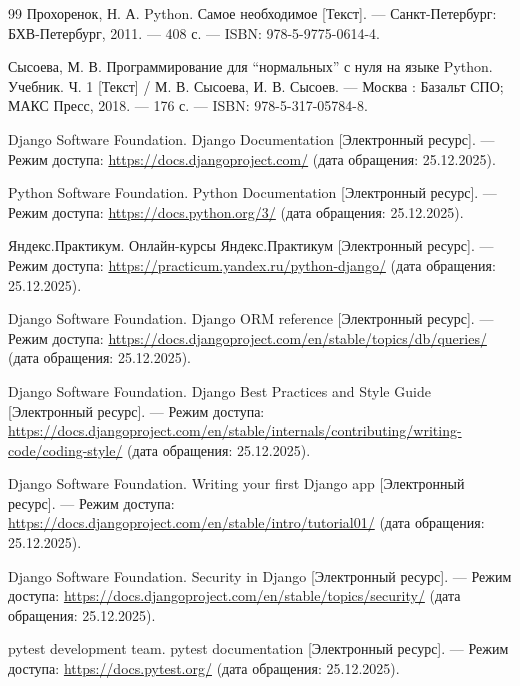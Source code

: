 \documentclass[pract,och,bachelor]{SCWorks}
\begin{document}
\begin{thebibliography}{99}
     Прохоренок, Н. А. Python. Самое необходимое [Текст]. — Санкт-Петербург: БХВ-Петербург, 2011. — 408 с. — ISBN: 978-5-9775-0614-4.
    
     Сысоева, М. В. Программирование для ``нормальных'' с нуля на языке Python. Учебник. Ч. 1 [Текст] / М. В. Сысоева, И. В. Сысоев. — Москва : Базальт СПО; МАКС Пресс, 2018. — 176 с. — ISBN: 978-5-317-05784-8.
    
     Django Software Foundation. Django Documentation [Электронный ресурс]. — Режим доступа: \url{https://docs.djangoproject.com/} (дата обращения: 25.12.2025).
    
     Python Software Foundation. Python Documentation [Электронный ресурс]. — Режим доступа: \url{https://docs.python.org/3/} (дата обращения: 25.12.2025).
    
     Яндекс.Практикум. Онлайн-курсы Яндекс.Практикум [Электронный ресурс]. — Режим доступа: \url{https://practicum.yandex.ru/python-django/} (дата обращения: 25.12.2025).
    
     Django Software Foundation. Django ORM reference [Электронный ресурс]. — Режим доступа: \url{https://docs.djangoproject.com/en/stable/topics/db/queries/} (дата обращения: 25.12.2025).
    
     Django Software Foundation. Django Best Practices and Style Guide [Электронный ресурс]. — Режим доступа: \url{https://docs.djangoproject.com/en/stable/internals/contributing/writing-code/coding-style/} (дата обращения: 25.12.2025).
    
     Django Software Foundation. Writing your first Django app [Электронный ресурс]. — Режим доступа: \url{https://docs.djangoproject.com/en/stable/intro/tutorial01/} (дата обращения: 25.12.2025).
    
     Django Software Foundation. Security in Django [Электронный ресурс]. — Режим доступа: \url{https://docs.djangoproject.com/en/stable/topics/security/} (дата обращения: 25.12.2025).
    
     pytest development team. pytest documentation [Электронный ресурс]. — Режим доступа: \url{https://docs.pytest.org/} (дата обращения: 25.12.2025).
\end{thebibliography}
\end{document}
